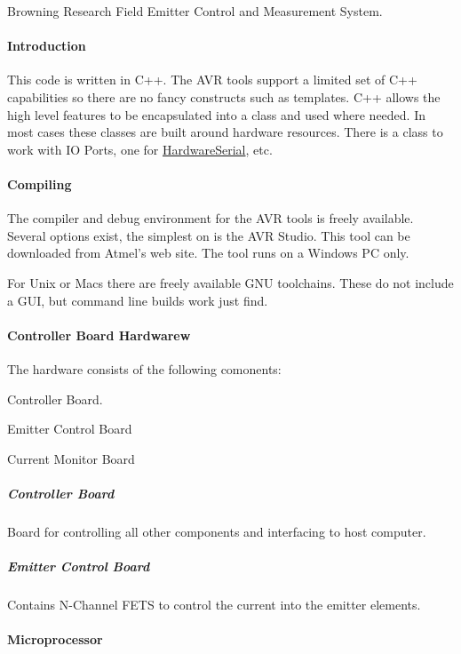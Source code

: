 Browning Research Field Emitter Control and Measurement System.\paragraph*{Introduction }

This code is written in C++. The AVR tools support a limited set of C++ capabilities so there are no fancy constructs such as templates. C++ allows the high level features to be encapsulated into a class and used where needed. In most cases these classes are built around hardware resources. There is a class to work with IO Ports, one for \hyperlink{class_hardware_serial}{HardwareSerial}, etc.

\paragraph*{Compiling }

The compiler and debug environment for the AVR tools is freely available. Several options exist, the simplest on is the AVR Studio. This tool can be downloaded from Atmel's web site. The tool runs on a Windows PC only.

For Unix or Macs there are freely available GNU toolchains. These do not include a GUI, but command line builds work just find.

\paragraph*{Controller Board Hardwarew }

The hardware consists of the following comonents:


\begin{DoxyItemize}
\item Controller Board.  
\item Emitter Control Board 
\item Current Monitor Board 
\end{DoxyItemize}

\subparagraph*{Controller Board}

Board for controlling all other components and interfacing to host computer.

\subparagraph*{Emitter Control Board}

Contains N-\/Channel FETS to control the current into the emitter elements.

\paragraph*{Microprocessor}

